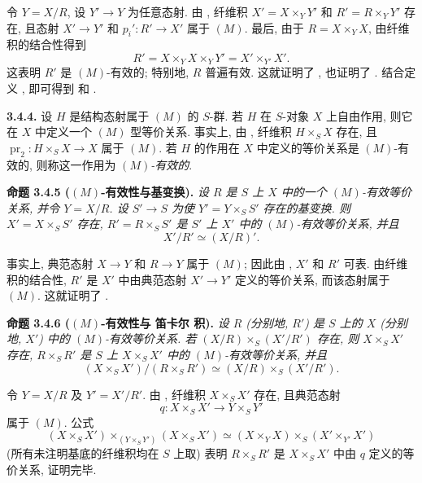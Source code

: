 令 \(Y=X/R\), 设 \(Y'\to Y\) 为任意态射.
由 ,
纤维积 \(X'=X\times_Y Y'\) 和 \(R'=R\times_Y Y'\) 存在,
且态射 \(X'\to Y'\) 和 \(p_i':R'\to X'\) 属于 \((M)\).
最后, 由于 \(R=X\times_Y X\), 由纤维积的结合性得到
\[
  R'=X\times_Y X\times_Y Y'=X'\times_{Y'}X'.
\]
这表明 \(R'\) 是 \((M)\)-有效的; 特别地, \(R\) 普遍有效.
这就证明了 ,
也证明了 .
结合定义 ,
即可得到  和
.

\medskip
\noindent{}\textbf{3.4.4.}
设 \(H\) 是结构态射属于 \((M)\) 的 \(S\)-群.
若 \(H\) 在 \(S\)-对象 \(X\) 上自由作用,
则它在 \(X\) 中定义一个 \((M)\) 型等价关系.
事实上, 由 ,
纤维积 \(H\times_S X\) 存在, 且
\(\operatorname{pr}_2:H\times_S X\to X\) 属于 \((M)\).
若 \(H\) 的作用在 \(X\) 中定义的等价关系是 \((M)\)-有效的,
则称这一作用为 \emph{\((M)\)-有效的}.

\medskip
\noindent{}\textbf{命题 3.4.5 (\((M)\)-有效性与基变换).}
\textit{设 \(R\) 是 \(S\) 上 \(X\) 中的一个 \((M)\)-有效等价关系,
并令 \(Y=X/R\). 设 \(S'\to S\) 为使 \(Y'=Y\times_S S'\)
存在的基变换. 则 \(X'=X\times_S S'\) 存在,
\(R'=R\times_S S'\) 是 \(S'\) 上 \(X'\) 中的
\((M)\)-有效等价关系, 并且}
\[
  X'/R'\simeq (X/R)'.
\]

事实上, 典范态射 \(X\to Y\) 和 \(R\to Y\) 属于 \((M)\);
因此由 ,
\(X'\) 和 \(R'\) 可表. 由纤维积的结合性, \(R'\) 是
\(X'\) 中由典范态射 \(X'\to Y'\) 定义的等价关系,
而该态射属于 \((M)\). 这就证明了
.

\medskip
\noindent{}\textbf{命题 3.4.6 (\((M)\)-有效性与 笛卡尔 积).}
\textit{设 \(R\) (分别地, \(R'\)) 是 \(S\) 上的
\(X\) (分别地, \(X'\)) 中的 \((M)\)-有效等价关系.
若 \((X/R)\times_S(X'/R')\) 存在, 则 \(X\times_SX'\) 存在,
\(R\times_SR'\) 是 \(S\) 上 \(X\times_SX'\) 中的
\((M)\)-有效等价关系, 并且}
\[
  (X\times_SX')/(R\times_SR')
  \simeq (X/R)\times_S(X'/R').
\]

令 \(Y=X/R\) 及 \(Y'=X'/R'\).
由 ,
纤维积 \(X\times_SX'\) 存在, 且典范态射
\[
  q:X\times_SX'\longrightarrow Y\times_SY'
\]
属于 \((M)\). 公式
\[
  (X\times_SX')\times_{(Y\times_SY')}(X\times_SX')
  \simeq (X\times_YX)\times_S(X'\times_{Y'}X')
\]
(所有未注明基底的纤维积均在 \(S\) 上取)
表明 \(R\times_SR'\) 是 \(X\times_SX'\) 中由 \(q\) 定义的等价关系,
证明完毕.

